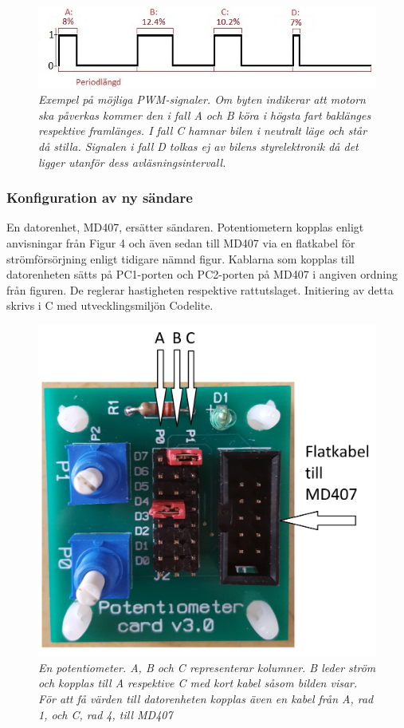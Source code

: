 \documentclass[a4paper]{article}
\begin{document}
\begin{figure}[H]
\includegraphics[scale=1]{PWMsignals.jpg}
\centering
\caption{\it Exempel på möjliga PWM-signaler. Om byten indikerar att motorn ska påverkas kommer den i fall A och B köra i högsta fart baklänges respektive framlänges. I fall C hamnar bilen i neutralt läge och står då stilla. Signalen i fall D tolkas ej av bilens styrelektronik då det ligger utanför dess avläsningsintervall.}
\end{figure} 



\subsubsection{Konfiguration av ny sändare}
En datorenhet, MD407, ersätter sändaren. Potentiometern kopplas enligt anvisningar från Figur 4 och även sedan till MD407 via en flatkabel för strömförsörjning enligt tidigare nämnd figur. Kablarna som kopplas till datorenheten sätts på PC1-porten och PC2-porten på MD407 i angiven ordning från figuren. De reglerar hastigheten respektive rattutslaget. Initiering av detta skrivs i C med utvecklingsmiljön Codelite.


\begin{figure}[H]
\includegraphics[scale=0.05]{PotentiometerMedRitning.jpg}
\centering
\caption{\it En potentiometer. A, B och C representerar kolumner. B leder ström och kopplas till A respektive C med kort kabel såsom bilden visar. För att få värden till datorenheten kopplas även en kabel från A, rad 1, och C, rad 4, till MD407}
\end{figure} 
\end{document}
